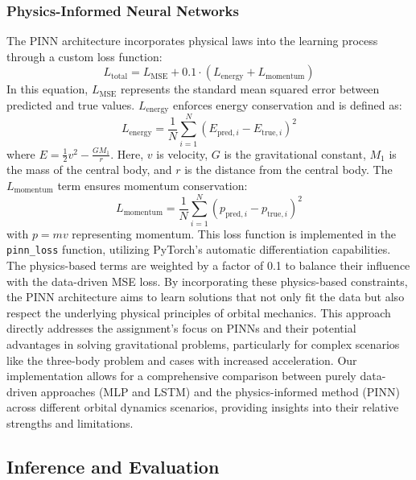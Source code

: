 \documentclass[11pt,a4paper, twocolumn]{article}
\begin{document}
\subsubsection{Physics-Informed Neural Networks}
The PINN architecture incorporates physical laws into the learning process through a custom loss function:
\begin{equation}
L_{\text{total}} = L_{\text{MSE}} + 0.1 \cdot (L_{\text{energy}} + L_{\text{momentum}})
\end{equation}
In this equation, $L_{\text{MSE}}$ represents the standard mean squared error between predicted and true values. $L_{\text{energy}}$ enforces energy conservation and is defined as:
\begin{equation}
L_{\text{energy}} = \frac{1}{N} \sum_{i=1}^N (E_{\text{pred},i} - E_{\text{true},i})^2
\end{equation}
where $E = \frac{1}{2}v^2 - \frac{GM_1}{r}$. Here, $v$ is velocity, $G$ is the gravitational constant, $M_1$ is the mass of the central body, and $r$ is the distance from the central body.
The $L_{\text{momentum}}$ term ensures momentum conservation:
\begin{equation}
L_{\text{momentum}} = \frac{1}{N} \sum_{i=1}^N (p_{\text{pred},i} - p_{\text{true},i})^2
\end{equation}
with $p = mv$ representing momentum.
This loss function is implemented in the \texttt{pinn\_loss} function, utilizing PyTorch's automatic differentiation capabilities. The physics-based terms are weighted by a factor of 0.1 to balance their influence with the data-driven MSE loss.
By incorporating these physics-based constraints, the PINN architecture aims to learn solutions that not only fit the data but also respect the underlying physical principles of orbital mechanics. This approach directly addresses the assignment's focus on PINNs and their potential advantages in solving gravitational problems, particularly for complex scenarios like the three-body problem and cases with increased acceleration.
Our implementation allows for a comprehensive comparison between purely data-driven approaches (MLP and LSTM) and the physics-informed method (PINN) across different orbital dynamics scenarios, providing insights into their relative strengths and limitations.
\subsection{Inference and Evaluation}
\end{document}
